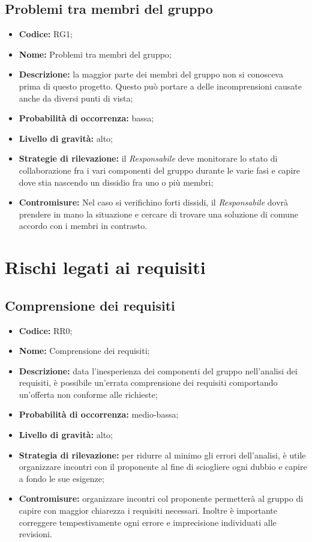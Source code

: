 \documentclass[./PianodiProgetto.tex]{subfiles}
\begin{document}
\subsection{Problemi tra membri del gruppo}
\begin{itemize}
	\item \textbf{Codice:} RG1;
	\item \textbf{Nome:} Problemi tra membri del gruppo;
	\item \textbf{Descrizione:} la maggior parte dei membri del gruppo non si conosceva prima di questo progetto. Questo può portare a delle incomprensioni causate anche da diversi punti di vista;
	\item \textbf{Probabilità di occorrenza:} bassa;
	\item \textbf{Livello di gravità:} alto;
	\item \textbf{Strategie di rilevazione:} il \textit{Responsabile} deve monitorare lo stato di collaborazione fra i vari componenti del gruppo durante le varie fasi e capire dove stia nascendo un dissidio fra uno o più membri;
	\item \textbf{Contromisure:} Nel caso si verifichino forti dissidi, il \textit{Responsabile} dovrà prendere in mano la situazione e cercare di trovare una soluzione di comune accordo con i membri in contrasto. 
\end{itemize}

\section{Rischi legati ai requisiti}
\subsection{Comprensione dei requisiti}
\begin{itemize}
	\item \textbf{Codice:} RR0;
	\item \textbf{Nome:} Comprensione dei requisiti;
	\item \textbf{Descrizione:} data l'inesperienza dei componenti del gruppo nell'analisi dei requisiti, è possibile un'errata comprensione dei requisiti comportando un'offerta non conforme alle richieste;
	\item \textbf{Probabilità di occorrenza:} medio-bassa;
	\item \textbf{Livello di gravità:} alto;
	\item \textbf{Strategia di rilevazione:} per ridurre al minimo gli errori dell'analisi, è utile organizzare incontri con il proponente al fine di sciogliere ogni dubbio e capire a fondo le sue esigenze;
	\item \textbf{Contromisure:} organizzare incontri col proponente permetterà al gruppo di capire con maggior chiarezza i requisiti necessari. Inoltre è importante correggere tempestivamente ogni errore e imprecisione individuati alle revisioni. 
\end{itemize}
\end{document}
